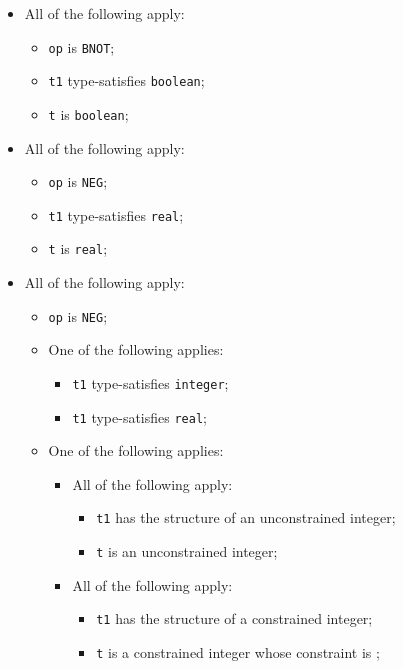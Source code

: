 \documentclass{book}
\begin{document}
  \begin{itemize}
  \item All of the following apply:
    \begin{itemize}
      \item \texttt{op} is \texttt{BNOT};
      \item \texttt{t1} type-satisfies \texttt{boolean};
      \item \texttt{t} is \texttt{boolean};
    \end{itemize}

  \item All of the following apply:
  \begin{itemize}
    \item \texttt{op} is \texttt{NEG};
    \item \texttt{t1} type-satisfies \texttt{real};
    \item \texttt{t} is \texttt{real};
  \end{itemize}

  \item All of the following apply:
    \begin{itemize}
    \item \texttt{op} is \texttt{NEG};
    \item One of the following applies:
      \begin{itemize}
      \item \texttt{t1} type-satisfies \texttt{integer};
      \item \texttt{t1} type-satisfies \texttt{real};
      \end{itemize}
     \item One of the following applies:
       \begin{itemize}
       \item All of the following apply:
         \begin{itemize}
         \item \texttt{t1} has the structure of an unconstrained integer;
         \item \texttt{t} is an unconstrained integer;
         \end{itemize}
       \item All of the following apply:
         \begin{itemize}
         \item \texttt{t1} has the structure of a constrained integer;
         \item \texttt{t} is a constrained integer whose constraint is ;
         \end{itemize}
       \end{itemize}
    \end{itemize}


\end{itemize}
\end{document}
